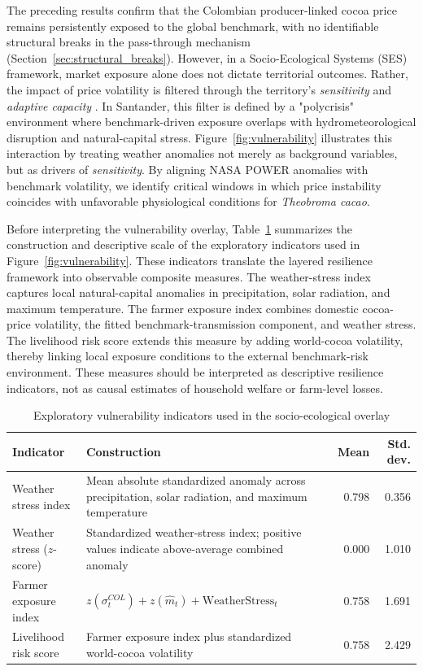 \documentclass[11pt]{article}
\begin{document}
The preceding results confirm that the Colombian producer-linked cocoa price remains persistently exposed to the global benchmark, with no identifiable structural breaks in the pass-through mechanism (Section~\ref{sec:structural_breaks}). However, in a Socio-Ecological Systems (SES) framework, market exposure alone does not dictate territorial outcomes. Rather, the impact of price volatility is filtered through the territory's \textit{sensitivity} and \textit{adaptive capacity} \citep{Turner2003, Adger2006}. In Santander, this filter is defined by a "polycrisis" environment where benchmark-driven exposure overlaps with hydrometeorological disruption and natural-capital stress. Figure~\ref{fig:vulnerability} illustrates this interaction by treating weather anomalies not merely as background variables, but as drivers of \textit{sensitivity}. By aligning NASA POWER anomalies with benchmark volatility, we identify critical windows in which price instability coincides with unfavorable physiological conditions for \textit{Theobroma cacao}.

Before interpreting the vulnerability overlay, Table~\ref{tab:vulnerability_indicators} summarizes the construction and descriptive scale of the exploratory indicators used in Figure~\ref{fig:vulnerability}. These indicators translate the layered resilience framework into observable composite measures. The weather-stress index captures local natural-capital anomalies in precipitation, solar radiation, and maximum temperature. The farmer exposure index combines domestic cocoa-price volatility, the fitted benchmark-transmission component, and weather stress. The livelihood risk score extends this measure by adding world-cocoa volatility, thereby linking local exposure conditions to the external benchmark-risk environment. These measures should be interpreted as descriptive resilience indicators, not as causal estimates of household welfare or farm-level losses.

\begin{table}[H]
\centering
\caption{Exploratory vulnerability indicators used in the socio-ecological overlay}
\label{tab:vulnerability_indicators}
\small
\begin{tabular}{p{3.0cm}p{8.2cm}rr}
\toprule
Indicator & Construction & Mean & Std. dev. \\
\midrule
Weather stress index & Mean absolute standardized anomaly across precipitation, solar radiation, and maximum temperature & 0.798 & 0.356 \\
Weather stress ($z$-score) & Standardized weather-stress index; positive values indicate above-average combined anomaly & 0.000 & 1.010 \\
Farmer exposure index & $z(\sigma^{COL}_t) + z(\widehat{m}_t) + \mathrm{WeatherStress}_t$ & 0.758 & 1.691 \\
Livelihood risk score & Farmer exposure index plus standardized world-cocoa volatility & 0.758 & 2.429 \\
\bottomrule
\end{tabular}
\end{table}
\end{document}
